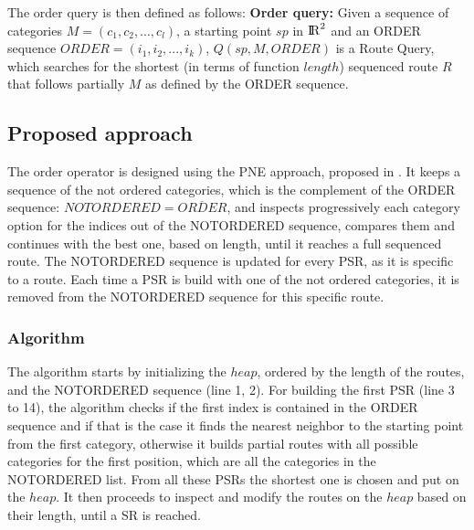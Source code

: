 The order query is then defined as follows: \newline
\textbf{Order query:} Given a sequence of categories $M = (c_1, c_2, ..., c_l)$, a starting point $sp$ in ${\rm I\!R}^2$ and an ORDER sequence $ORDER = (i_1, i_2, ..., i_k)$, $Q(sp, M, ORDER)$ is a Route Query, which searches for the shortest (in terms of function $length$) sequenced route $R$ that follows partially $M$ as defined by the ORDER sequence.


\subsection{Proposed approach} 
\label{sec:approachOrder}
The order operator is designed using the PNE approach, proposed in \cite{OSR}. It keeps a sequence of the not ordered categories, which is the complement of the ORDER sequence: $NOTORDERED = \overline{ORDER}$, and inspects progressively each category option for the indices out of the NOTORDERED sequence, compares them and continues with the best one, based on length, until it reaches a full sequenced route. The NOTORDERED sequence is updated for every PSR, as it is specific to a route. Each time a PSR is build with one of the not ordered categories, it is removed from the NOTORDERED sequence for this specific route.

\subsubsection{Algorithm}
\label{sec:algortihmOrder}
The algorithm \texttt{} starts by initializing the $heap$, ordered by the length of the routes, and the NOTORDERED sequence (line 1, 2). For building the first PSR (line 3 to 14), the algorithm checks if the first index is contained in the ORDER sequence and if that is the case it finds the nearest neighbor to the starting point from the first category, otherwise it builds partial routes with all possible categories for the first position, which are all the categories in the NOTORDERED list. From all these PSRs the shortest one is chosen and put on the $heap$. It then proceeds to inspect and modify the routes on the $heap$ based on their length, until a SR is reached. 

